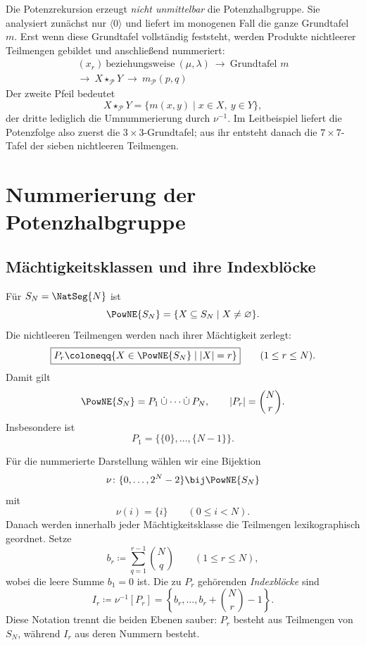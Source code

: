 \documentclass[main.tex]{subfiles}
\begin{document}
\begin{remark}
Die Potenzrekursion erzeugt \emph{nicht unmittelbar} die Potenzhalbgruppe.
Sie analysiert zunächst nur \(\langle0\rangle\) und liefert im monogenen Fall
die ganze Grundtafel \(m\).  Erst wenn diese Grundtafel vollständig feststeht,
werden Produkte nichtleerer Teilmengen gebildet und anschließend nummeriert:
\[
\boxed{
\begin{gathered}
  (x_r)\ \text{beziehungsweise}\ (\mu,\lambda)
  \ \longrightarrow\ \text{Grundtafel }m\\
  \longrightarrow\ X\star_{\mathcal P}Y
  \ \longrightarrow\ m_{\mathcal P}(p,q)
\end{gathered}
}
\]
Der zweite Pfeil bedeutet
\[
  X\star_{\mathcal P}Y
  =
  \{m(x,y)\mid x\in X,\ y\in Y\},
\]
der dritte lediglich die Umnummerierung durch \(\nu^{-1}\).  Im Leitbeispiel
liefert die Potenzfolge also zuerst die \(3\times3\)-Grundtafel; aus ihr
entsteht danach die \(7\times7\)-Tafel der sieben nichtleeren Teilmengen.
\end{remark}


\section{Nummerierung der Potenzhalbgruppe}

\subsection{Mächtigkeitsklassen und ihre Indexblöcke}

Für \(S_N=\NatSeg{N}\) ist
\[
  \PowNE{S_N}
  =
  \{X\subseteq S_N\mid X\neq\varnothing\}.
\]
Die nichtleeren Teilmengen werden nach ihrer Mächtigkeit zerlegt:
\[
  \boxed{
  P_r
  \coloneqq
  \{X\in\PowNE{S_N}\mid |X|=r\}}
  \qquad(1\leq r\leq N).
\]
Damit gilt
\[
  \PowNE{S_N}
  =
  P_1\mathbin{\dot\cup}\cdots\mathbin{\dot\cup}P_N,
  \qquad
  |P_r|=\binom{N}{r}.
\]
Insbesondere ist
\[
  P_1=\bigl\{\{0\},\ldots,\{N-1\}\bigr\}.
\]

Für die nummerierte Darstellung wählen wir eine Bijektion
\[
  \nu\colon
  \{0,\ldots,2^N-2\}
  \bij
  \PowNE{S_N}
\]
mit
\[
  \nu(i)=\{i\}
  \qquad(0\leq i<N).
\]
Danach werden innerhalb jeder Mächtigkeitsklasse die Teilmengen
lexikographisch geordnet.  Setze
\[
  b_r\coloneqq
  \sum_{q=1}^{r-1}\binom{N}{q}
  \qquad(1\leq r\leq N),
\]
wobei die leere Summe \(b_1=0\) ist.  Die zu \(P_r\) gehörenden
\emph{Indexblöcke} sind
\[
  \boxed{
  I_r
  \coloneqq
  \nu^{-1}[P_r]
  =
  \left\{
    b_r,\ldots,b_r+\binom{N}{r}-1
  \right\}.}
\]
Diese Notation trennt die beiden Ebenen sauber: \(P_r\) besteht aus
Teilmengen von \(S_N\), während \(I_r\) aus deren Nummern besteht.
\end{document}
